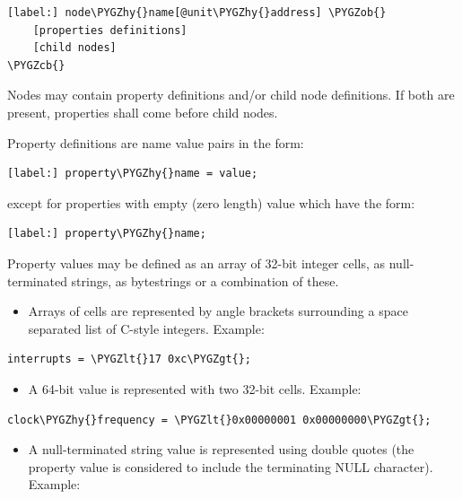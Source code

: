 \documentclass[a4paper,10pt,oneside]{sphinxmanual}
\def\PYGZob{\char`\{}
\def\PYGZcb{\char`\}}
\def\PYGZlt{\char`\<}
\def\PYGZgt{\char`\>}
\def\PYGZhy{\char`\-}
\begin{document}
\begin{Verbatim}[commandchars=\\\{\}]
[label:] node\PYGZhy{}name[@unit\PYGZhy{}address] \PYGZob{}
    [properties definitions]
    [child nodes]
\PYGZcb{}
\end{Verbatim}

Nodes may contain property definitions and/or child node definitions. If
both are present, properties shall come before child nodes.

Property definitions are name value pairs in the form:

\begin{Verbatim}[commandchars=\\\{\}]
[label:] property\PYGZhy{}name = value;
\end{Verbatim}

except for properties with empty (zero length) value which have the
form:

\begin{Verbatim}[commandchars=\\\{\}]
[label:] property\PYGZhy{}name;
\end{Verbatim}

Property values may be defined as an array of 32-bit integer cells, as
null-terminated strings, as bytestrings or a combination of these.
\begin{itemize}
\item {} 
Arrays of cells are represented by angle brackets surrounding a space
separated list of C-style integers. Example:

\end{itemize}

\begin{Verbatim}[commandchars=\\\{\}]
interrupts = \PYGZlt{}17 0xc\PYGZgt{};
\end{Verbatim}
\begin{itemize}
\item {} 
A 64-bit value is represented with two 32-bit cells. Example:

\end{itemize}

\begin{Verbatim}[commandchars=\\\{\}]
clock\PYGZhy{}frequency = \PYGZlt{}0x00000001 0x00000000\PYGZgt{};
\end{Verbatim}
\begin{itemize}
\item {} 
A null-terminated string value is represented using double quotes
(the property value is considered to include the terminating NULL
character). Example:

\end{itemize}
\end{document}
